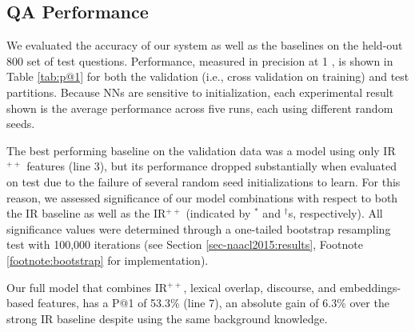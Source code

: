 \subsection{QA Performance}
\label{sec-emnlp2017:accuracy}
We evaluated the accuracy of our system as well as the baselines on the held-out 800 set of test questions.  Performance, measured in precision at 1 \citep[P@1;][]{manning08}, is shown in Table \ref{tab:p@1} for both the validation (i.e., cross validation on training) and test partitions.  Because NNs are sensitive to initialization, each experimental result shown is the average performance across five runs, each using different random seeds.   

The best performing baseline on the validation data was a model using only IR$^{++}$ features (line 3), but its performance dropped substantially when evaluated on test due to the failure of several random seed initializations to learn.  For this reason, we assessed significance of our model combinations with respect to both the IR baseline as well as the IR$^{++}$ (indicated by $^*$ and $^{\dagger}$s, respectively). All significance values were determined through a one-tailed bootstrap resampling test with 100,000 iterations (see Section \ref{sec-naacl2015:results}, Footnote \ref{footnote:bootstrap} for implementation).

Our full model that combines IR$^{++}$, lexical overlap, discourse, and embeddings-based features, has a P@1 of 53.3\% (line 7), an absolute gain of 6.3\% over the strong IR baseline despite using the same background knowledge.  

